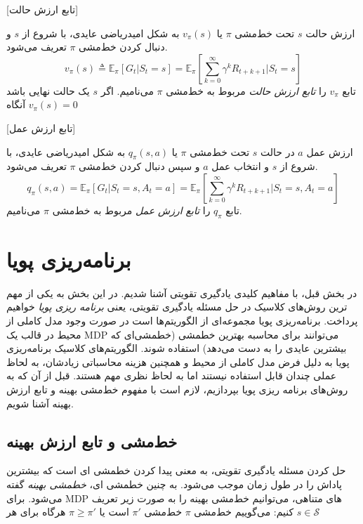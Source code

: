 [تابع ارزش حالت]

 ارزش حالت $s$ تحت خط‌مشی $\pi$ یا $v_\pi(s)$ به شکل امیدریاضی عایدی، با شروع از $s$ و دنبال کردن خط‌مشی $\pi$ تعریف می‌شود.
$$v_\pi(s) \triangleq \mathbb{E}_\pi\left[G_t| S_t=s\right] = \mathbb{E}_\pi\left[\sum_{k=0}^{\infty} \gamma^k R_{t+k+1}|S_t =s \right]$$
تابع $v_\pi$ را 
\textit{تابع ارزش حالت}
 مربوط به خط‌مشی 
$\pi$
می‌نامیم. اگر $s$ یک حالت نهایی باشد آنگاه 
$v_\pi(s) = 0$

\label{statevaluedef}

[تابع ارزش عمل]

ارزش عمل  $a$ در حالت
$s$
 تحت خط‌مشی $\pi$ یا 
 $q_\pi(s,a)$
  به شکل امیدریاضی عایدی، با شروع از $s$ و انتخاب عمل $a$  و سپس دنبال کردن خط‌مشی $\pi$ تعریف می‌شود.
$$q_\pi(s,a) = \mathbb{E}_\pi\left[G_t| S_t=s, A_t=a\right] = \mathbb{E}_\pi\left[\sum_{k=0}^{\infty} \gamma^k R_{t+k+1}|S_t =s, A_t=a \right]$$
تابع $q_\pi$ را 
\textit{تابع ارزش عمل}
 مربوط به خط‌مشی 
$\pi$
می‌نامیم.
\section{برنامه‌ریزی پویا}
در بخش قبل، با مفاهیم کلیدی یادگیری تقویتی آشنا شدیم. در این بخش به یکی از مهم ترین روش‌های کلاسیک در حل مسئله یادگیری تقویتی، یعنی 
\textit{برنامه ریزی پویا}
خواهیم پرداخت. برنامه‌ریزی پویا
 مجموعه‌ای از الگوریتم‌ها است در صورت وجود مدل کاملی از محیط در قالب یک 
MDP
 می‌توانند برای محاسبه بهترین خط\nf مشی (خط\nf مشی‌ای که بیشترین عایدی را به دست می‌دهد)   استفاده شوند.
الگوریتم‌های کلاسیک برنامه‌ریزی پویا به دلیل فرض
مدل کاملی از محیط و همچنین هزینه محاسباتی زیادشان، به لحاظ عملی چندان قابل استفاده نیستند اما به لحاظ نظری مهم هستند. قبل از آن که به روش‌های برنامه ریزی پویا بپردازیم، لازم است با مفهوم خط‌مشی بهینه و تابع ارزش بهینه آشنا شویم.
\subsection{خط‌مشی و تابع ارزش بهینه}
حل کردن مسئله یادگیری تقویتی، به معنی پیدا کردن خط\nf مشی ای است که بیشترین پاداش را در طول زمان موجب می‌شود.	به چنین خط\nf مشی ای، 
\textit{خط\nf مشی بهینه} 
گفته می‌شود. برای
 MDP‌ 
 های متناهی، می‌توانیم خط‌مشی بهینه را به صورت زیر تعریف کنیم:
می‌گوییم خط‌مشی $\pi$  خط‌مشی 
$\pi'$
است یا
$\pi \ge \pi'$
هرگاه برای هر 
$s \in \mathcal{S}$

